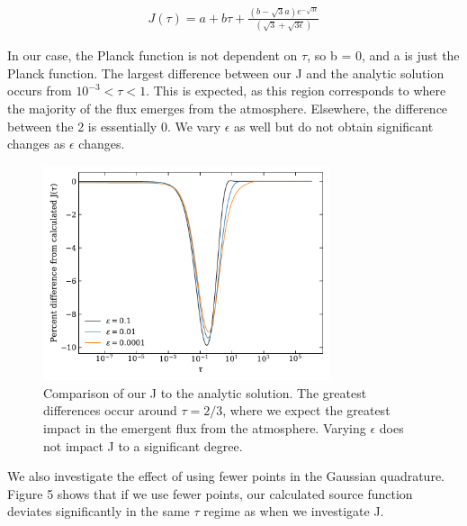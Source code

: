 \documentclass[12pt]{article}
\begin{document}
\begin{equation}
\begin{split}
   J(\tau) = a + b\tau + \frac{(b - \sqrt{3}a)e^{-\sqrt{3\epsilon}}}{(\sqrt{3}+\sqrt{3\epsilon})}
\end{split}
\end{equation}

In our case, the Planck function is not dependent on $\tau$, so b = 0, and a is just the Planck function. 
The largest difference between our J and the analytic solution occurs from $10^{-3} < \tau < 1$. This is expected, as this region corresponds to where the majority of the flux emerges from the atmosphere. Elsewhere, the difference between the 2 is essentially 0. We vary $\epsilon$ as well but do not obtain significant changes as $\epsilon$ changes.


\begin{figure}[ht]
 \centering
 \includegraphics[width=0.75\textwidth]{J_comparison.pdf}
 \caption{Comparison of our J to the analytic solution. The greatest differences occur around $\tau = 2/3$, where we expect the greatest impact in the emergent flux from the atmosphere. Varying $\epsilon$ does not impact J to a significant degree.}
\end{figure}

We also investigate the effect of using fewer points in the Gaussian quadrature. Figure 5 shows that if we use fewer points, our calculated source function deviates significantly in the same $\tau$ regime as when we investigate J. 
\end{document}
